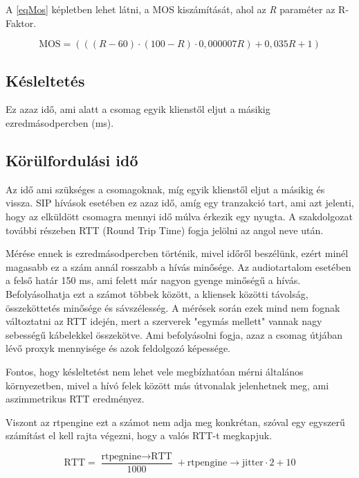A \ref{eqMos} képletben lehet látni, a MOS kiszámítását, ahol az \textit{R} paraméter 
az R-Faktor.

\begin{equation} \label{eqMos}
\text{MOS} = (((R-60) \cdot (100-R) \cdot 0,000007R) + 0,035R + 1)
\end{equation}

\subsection{Késleltetés}

Ez azaz idő, ami alatt a csomag egyik klienstől eljut a másikig ezredmásodpercben (ms). 

\subsection{Körülfordulási idő}

Az idő ami szükséges a csomagoknak, míg egyik klienstől eljut a másikig és vissza. SIP
hívások esetében ez azaz idő, amíg egy tranzakció tart, ami azt jelenti, hogy az elküldött
csomagra mennyi idő múlva érkezik egy nyugta. A szakdolgozat további részeben RTT (Round Trip Time)
fogja jelölni az angol neve után. 

Mérése ennek is ezredmásodpercben történik, mivel időről beszélünk, ezért minél magasabb ez a
szám annál rosszabb a hívás minősége. Az audiotartalom esetében a felső határ 150 ms, ami felett
már nagyon gyenge minőségű a hívás. Befolyásolhatja ezt a számot többek között, a kliensek 
közötti távolság, összeköttetés minősége és sávszélesség. A mérések során ezek mind nem fognak
változtatni az RTT idején, mert a szerverek "egymás mellett" vannak nagy sebességű kábelekkel
összekötve. Ami befolyásolni fogja, azaz a csomag útjában lévő proxyk mennyisége és azok feldolgozó
képessége. 

Fontos, hogy késleltetést nem lehet vele megbízhatóan mérni általános környezetben, mivel a hívó
felek között más útvonalak jelenhetnek meg, ami aszimmetrikus RTT eredményez. 

Viszont az rtpengine ezt a számot nem adja meg konkrétan, szóval egy egyszerű számítást
el kell rajta végezni, hogy a valós RTT-t megkapjuk.

\begin{equation}
\text{RTT} = \frac{\text{rtpegnine} \rightarrow \text{RTT}}{1000} + \text{rtpengine} \rightarrow \text{jitter} \cdot 2 + 10
\label{calcrtt}
\end{equation}

